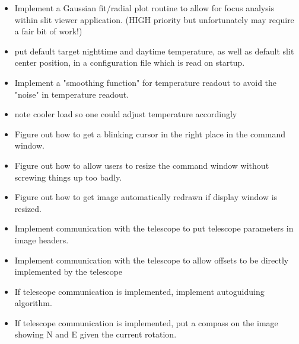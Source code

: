 \documentclass[10pt]{article}
\renewcommand{\[}{\begin{eqnarray}}
\renewcommand{\]}{\end{eqnarray}}
\begin{document}
\begin{itemize}
\item Implement a Gaussian fit/radial plot routine to allow for focus analysis
   within slit viewer application. (HIGH priority but unfortunately may
   require a fair bit of work!)

\item put default target nighttime and daytime temperature, as well as 
   default slit center position, in a configuration file which is read on
   startup.

\item Implement a "smoothing function" for temperature readout to avoid the
   "noise" in temperature readout.

\item note cooler load so one could adjust temperature accordingly

\item Figure out how to get a blinking cursor in the right place in the command 
   window.

\item Figure out how to allow users to resize the command window without 
   screwing things up too badly.

\item Figure out how to get image automatically redrawn if display window is
   resized.

\item Implement communication with the telescope to put telescope parameters
   in image headers.

\item Implement communication with the telescope to allow offsets to be
   directly implemented by the telescope

\item If telescope communication is implemented, implement autoguiduing 
   algorithm.

\item If telescope communication is implemented, put a compass on the image
   showing N and E given the current rotation.

\end{itemize}
\end{document}
